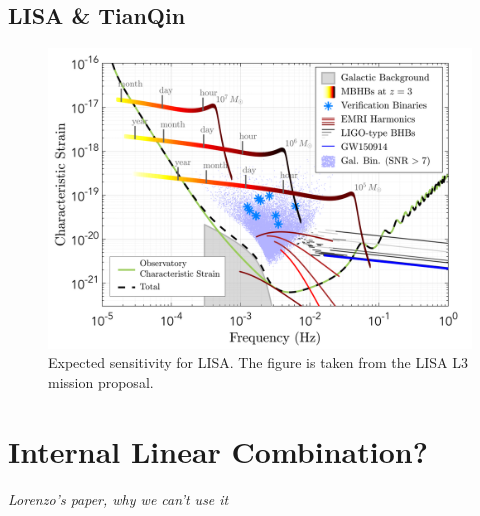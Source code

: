 \subsection{LISA \& TianQin}

\begin{figure}[h]
    \centering
    \includegraphics[width=0.7\linewidth]{Images/lisa_frequency_sensitivity.png}
    \caption{Expected sensitivity for LISA. The figure is taken from the LISA L3 mission proposal.}
    \label{LISA_F_sensitivity}
\end{figure} 

\section{Internal Linear Combination?}
\textit{Lorenzo's paper, why we can't use it}